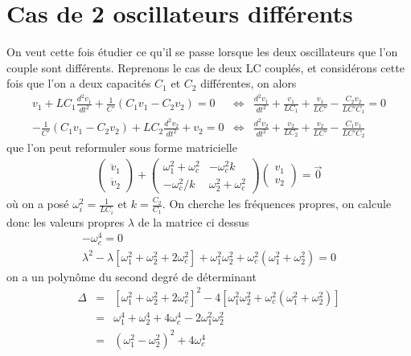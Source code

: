 \documentclass[12pt,prb,aps,epsf]{article}
\begin{document}
\section{Cas de 2 oscillateurs différents}
On veut cette fois étudier ce qu'il se passe lorsque les deux oscillateurs que l'on couple sont différents. Reprenons le cas de deux LC couplés, et considérons cette fois que l'on a deux capacités $C_1$ et $C_2$ différentes, on alors 
\begin{eqnarray}
 v_1 + LC_1\frac{d^2v_1}{dt^2} +  \frac{1}{C'}(C_1v_1 -C_2v_2) = 0 &\Leftrightarrow&  \frac{d^2v_1}{dt^2} + \frac{v_1}{LC_1} +   \frac{v_1}{LC'} -\frac{C_2v_2}{LC'C_1} = 0\\
-\frac{1}{C'}(C_1v_1 -C_2v_2) + LC_2\frac{d^2v_2}{dt^2} + v_2 = 0 &\Leftrightarrow&  \frac{d^2v_2}{dt^2} + \frac{v_2}{LC_2} + \frac{v_2}{LC'} -\frac{C_1v_1}{LC'C_2}
\end{eqnarray}
que l'on peut reformuler sous forme matricielle 
\begin{eqnarray}
\begin{pmatrix}
\ddot{v}_1\\
\ddot{v}_2
\end{pmatrix}
+\begin{pmatrix}
\omega_1^2 +\omega_c^2&  -\omega_c^2k\\
-\omega_c^2/k & \omega_2^2+ \omega_c^2
\end{pmatrix}
\begin{pmatrix}
v_1\\
v_2
\end{pmatrix} = \vec{0}
\end{eqnarray}
où on a posé $\omega_i^2 = \frac{1}{LC_i}$ et $k = \frac{C_2}{C_1}$. On cherche les fréquences propres, on calcule donc les valeurs propres $\lambda$ de la matrice ci dessus 
\begin{eqnarray}
[\omega_1^2 +\omega_c^2-\lambda][\omega_2^2+\omega_c^2-\lambda] - \omega_c^4 =0\\
\lambda^2 -\lambda [\omega_1^2  +\omega_2^2 + 2\omega_c^2] + \omega_1^2 \omega_2^2 + \omega_c^2(\omega_1^2+\omega_2^2)= 0
\end{eqnarray}
on a un polynôme du second degré de déterminant 
\begin{eqnarray}
\Delta &=& [\omega_1^2  +\omega_2^2 + 2\omega_c^2]^2 - 4[\omega_1^2 \omega_2^2 + \omega_c^2(\omega_1^2+\omega_2^2)] \\
&=& \omega_1^4 + \omega_2^4 + 4\omega_c^4 - 2 \omega_1^2\omega_2^2\\
&=& (\omega_1^2-\omega_2^2)^2 + 4\omega_c^4
\end{eqnarray}
\end{document}
